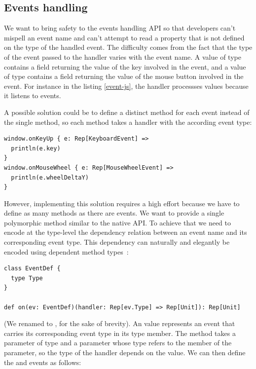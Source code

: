 \documentclass[american,english,runningheads]{llncs}
\begin{document}
\subsection{Events handling}

We want to bring safety to the events handling API so that developers can’t mispell an event name and can’t attempt
to read a property that is not defined on the type of the handled event. The difficulty comes from the fact that the
type of the event passed to the handler varies with the event name. A value of type  contains a
 field returning the value of the key involved in the event, and a value of type 
contains a  field returning the value of the mouse button involved in the event. For instance in
the listing \ref{event-js}, the handler processses  values because it listens to
 events.

A possible solution could be to define a distinct method for each event instead of the single 
method, so each method takes a handler with the according event type:

\begin{lstlisting}
window.onKeyUp { e: Rep[KeyboardEvent] =>
  println(e.key)
}
window.onMouseWheel { e: Rep[MouseWheelEvent] =>
  println(e.wheelDeltaY)
}
\end{lstlisting}

However, implementing this solution requires a high effort because we have to define as many methods as there are
events. We want to provide a single polymorphic method similar to the native API. To achieve that we need to encode
at the type-level the dependency relation between an event name and its corresponding event type. This dependency can
naturally and elegantly be encoded using dependent method types~\cite{Oliveira10_Typeclasses}:

\begin{lstlisting}
class EventDef {
  type Type
}

def on(ev: EventDef)(handler: Rep[ev.Type] => Rep[Unit]): Rep[Unit]
\end{lstlisting}

(We renamed  to , for the sake of brevity). An  value represents an
event that carries its corresponding event type in its  type member. The  method takes a
parameter  of type  and a  parameter whose type refers to the 
member of the  parameter, so the type of the handler depends on the  value. We can then define the
 and  events as follows:
\end{document}
